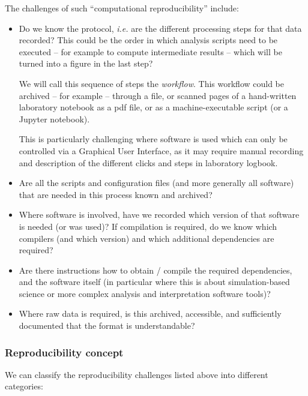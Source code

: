 The challenges of such ``computational reproducibility'' include:
\begin{itemize}
\item Do we know the protocol, \emph{i.e.} are the different
  processing steps for that data recorded? This could be the order in which
  analysis scripts need to be executed -- for example to compute intermediate
  results -- which will be turned into a figure in the last step?

We will call this sequence of steps the \emph{workflow}. This workflow could be
archived -- for example -- through a  file, or scanned
pages of a hand-written laboratory notebook as a pdf file, or as a
machine-executable script (or a Jupyter notebook).

This is particularly challenging where software is used which can only be
controlled via a Graphical User Interface, as it may require manual recording
and description of the different clicks and steps in laboratory logbook.

\item Are all the scripts and configuration files (and more generally all
software) that are needed in this process known and archived?

\item Where software is involved, have we recorded which version of that
software is needed (or was used)? If compilation is required, do we know which
compilers (and which version) and which additional dependencies are required?

\item Are there instructions how to obtain / compile the required dependencies,
and the software itself (in particular where this is about simulation-based
science or more complex analysis and interpretation software tools)?

\item Where raw data is required, is this archived, accessible, and sufficiently
documented that the format is understandable?
\end{itemize}


\subsubsection{Reproducibility concept}\label{sec:reproducibility-concept}

We can classify the reproducibility challenges listed above into different categories:

